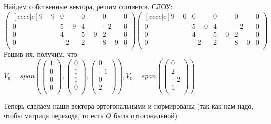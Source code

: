 \documentclass{article}
\renewcommand{\span}{span}
\begin{document}
Найдем собственные вектора, решим соответсв. СЛОУ:
$$\begin{pmatrix}[cccc|c]
    9-9 & 0& 0& 0 & 0\\
    0 & 5-9 & 4& -2& 0\\
     0 & 4 & 5-9 &2 & 0\\
      0 & -2 & 2&8-9 & 0\\
\end{pmatrix}
\begin{pmatrix}[cccc|c]
    9-0 & 0& 0& 0 & 0\\
    0 & 5-0 & 4& -2& 0\\
     0 & 4 & 5-0 &2 & 0\\
      0 & -2 & 2&8-0 & 0\\
\end{pmatrix}$$
Решив их, получим, что  $V_9 = \span (\begin{pmatrix}
    1 \\
    0\\
    0\\
    0\\
\end{pmatrix}, \begin{pmatrix}
    0 \\
    1\\
    1\\
    0\\
\end{pmatrix}, \begin{pmatrix}
    0 \\
    -1\\
    0\\
    2\\
\end{pmatrix}), V_0 = \span (\begin{pmatrix}
    0 \\
    2\\
    -2\\
    1\\
\end{pmatrix})$

Теперь сделаем наши вектора ортогональными и нормированы (так как нам надо, чтобы матрица перехода, то есть $Q$ была ортогональной). 
\end{document}
